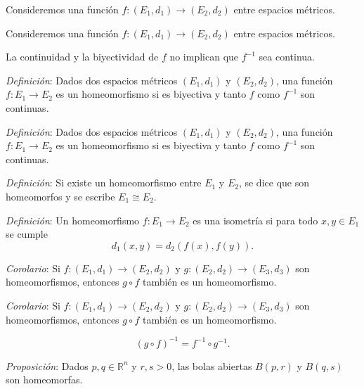 \documentclass{beamer}
\begin{document}
  \begin{frame}
    Consideremos una función $f:(E_1,d_1)\to(E_2,d_2)$ entre espacios métricos.
  \end{frame}

  \begin{frame}
    Consideremos una función $f:(E_1,d_1)\to(E_2,d_2)$ entre espacios métricos.

    La continuidad y la biyectividad de $f$ no implican que $f^{-1}$ sea continua.
  \end{frame}

  \begin{frame}
    \textit{Definición}: Dados dos espacios métricos $(E_1,d_1)$ y $(E_2,d_2)$, una función $f:E_1\to E_2$ es un homeomorfismo si es biyectiva y tanto $f$ como $f^{-1}$ son continuas.
  \end{frame}

  \begin{frame}
    \textit{Definición}: Dados dos espacios métricos $(E_1,d_1)$ y $(E_2,d_2)$, una función $f:E_1\to E_2$ es un homeomorfismo si es biyectiva y tanto $f$ como $f^{-1}$ son continuas.

    \textit{Definición}: Si existe un homeomorfismo entre $E_1$ y $E_2$, se dice que son homeomorfos y se escribe $E_1\cong E_2$.
  \end{frame}

  \begin{frame}
    \textit{Definición}: Un homeomorfismo $f:E_1\to E_2$ es una isometría si para todo $x,y\in E_1$ se cumple
    \[d_1(x,y)=d_2(f(x),f(y)).\]
  \end{frame}

  \begin{frame}
    \textit{Corolario}: Si $f:(E_1,d_1)\to(E_2,d_2)$ y $g:(E_2,d_2)\to(E_3,d_3)$ son homeomorfismos, entonces $g\circ f$ también es un homeomorfismo.
  \end{frame}

  \begin{frame}
    \textit{Corolario}: Si $f:(E_1,d_1)\to(E_2,d_2)$ y $g:(E_2,d_2)\to(E_3,d_3)$ son homeomorfismos, entonces $g\circ f$ también es un homeomorfismo.

    \[(g\circ f)^{-1}=f^{-1}\circ g^{-1}.\]
  \end{frame}

  \begin{frame}
    \textit{Proposición}: Dados $p,q\in\mathbb{R}^n$ y $r,s>0$, las bolas abiertas $B(p,r)$ y $B(q,s)$ son homeomorfas.
  \end{frame}
\end{document}
